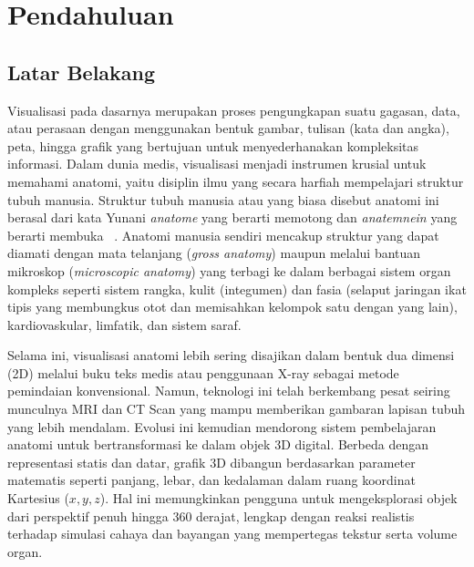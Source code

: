 
\chapter{Pendahuluan}
\label{chap:intro}
   
\section{Latar Belakang}
\label{sec:label}
        Visualisasi pada dasarnya merupakan proses pengungkapan suatu gagasan, data, atau perasaan dengan menggunakan bentuk gambar, tulisan (kata dan angka), peta, hingga grafik yang bertujuan untuk menyederhanakan kompleksitas informasi. Dalam dunia medis, visualisasi menjadi instrumen krusial untuk memahami anatomi, yaitu disiplin ilmu yang secara harfiah mempelajari struktur tubuh manusia. Struktur tubuh manusia atau yang biasa disebut anatomi ini berasal dari kata Yunani \textit{anatome} yang berarti memotong dan \textit{anatemnein} yang berarti membuka ~\cite{richard:12:grays}. Anatomi manusia sendiri mencakup struktur yang dapat diamati dengan mata telanjang (\textit{gross anatomy}) maupun melalui bantuan mikroskop (\textit{microscopic anatomy}) yang terbagi ke dalam berbagai sistem organ kompleks seperti sistem rangka, kulit (integumen) dan fasia (selaput jaringan ikat tipis yang membungkus otot dan memisahkan kelompok satu dengan yang lain), kardiovaskular, limfatik, dan sistem saraf.
    
         Selama ini, visualisasi anatomi lebih sering disajikan dalam bentuk dua dimensi (2D) melalui buku teks medis atau penggunaan X-ray sebagai metode pemindaian konvensional. Namun, teknologi ini telah berkembang pesat seiring munculnya MRI dan CT Scan yang mampu memberikan gambaran lapisan tubuh yang lebih mendalam. Evolusi ini kemudian mendorong sistem pembelajaran anatomi untuk bertransformasi ke dalam objek 3D digital. Berbeda dengan representasi statis dan datar, grafik 3D dibangun berdasarkan parameter matematis seperti panjang, lebar, dan kedalaman dalam ruang koordinat Kartesius ($x, y, z$). Hal ini memungkinkan pengguna untuk mengeksplorasi objek dari perspektif penuh hingga 360 derajat, lengkap dengan reaksi realistis terhadap simulasi cahaya dan bayangan yang mempertegas tekstur serta volume organ.

